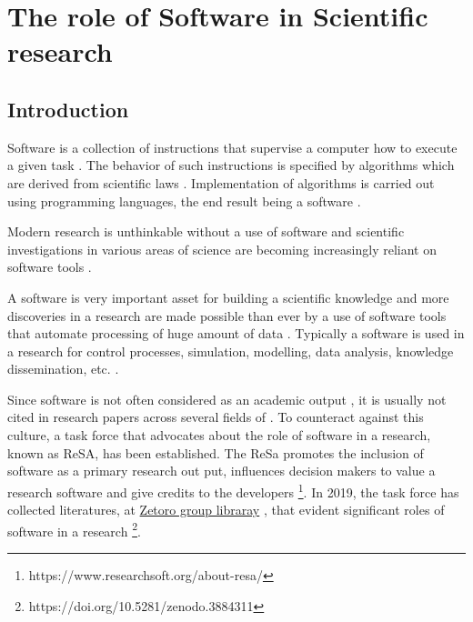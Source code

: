 \chapter{The role of Software in Scientific research}
\label{ch:Roles}

%

\section{Introduction}
\label{sec:background:intro}
Software is a collection of instructions that supervise a computer how to execute a given task \citep{enwiki:1056292826}. The behavior of such instructions is specified by algorithms which are derived from scientific laws \citep{wolfram1984computer}.  Implementation of algorithms is carried out using programming languages, the end result being a software \citep{enwiki:1055624679, enwiki:1055665216}. 

Modern research is unthinkable without a use of software and scientific investigations in various areas of science are becoming increasingly reliant on software tools \citep{goble2014better, wilson2014best, storer2017bridging}.

A software is very important asset for building a scientific knowledge and more discoveries in a research are made possible than ever by a use of software tools that automate processing of huge amount of data \citep{jimenez2017four}. Typically a software is used in a research for control processes, simulation, modelling, data analysis, knowledge dissemination, etc. \cite{hannay2009scientists, pan2016disciplinary}.

Since software is not often considered as an academic output \citep{yang2018important, pan2016disciplinary}, it is usually not cited in research papers across several fields of \cite{pan2016disciplinary}. To counteract against this culture, a task force that advocates about the role of software in a research, known as \ac{ReSA}, has been established. The ReSa promotes the inclusion of software as a primary research out put, influences decision makers to value a research software and give credits to the developers \footnote{https://www.researchsoft.org/about-resa/}. In 2019, the task force has collected literatures, at \href{https://www.zotero.org/groups/2400609/resa/library}{Zetoro group libraray} , that evident significant roles of software in a research \footnote{https://doi.org/10.5281/zenodo.3884311}.  



